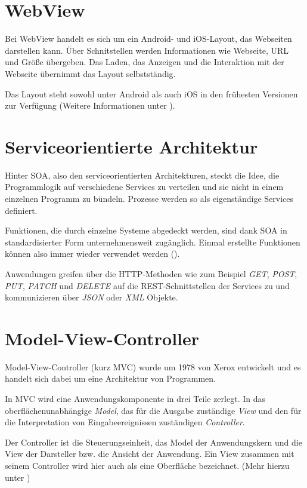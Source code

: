 \section{WebView}
Bei WebView handelt es sich um ein Android- und iOS-Layout, das Webseiten darstellen kann. Über Schnitstellen werden
Informationen wie Webseite, URL und Größe übergeben. Das Laden, das Anzeigen und die Interaktion mit der Webseite übernimmt
das Layout selbstständig.

Das Layout steht sowohl unter Android als auch iOS in den frühesten Versionen zur Verfügung (Weitere Informationen unter
\cite{online_grundlagen_webviewer}).

\section{Serviceorientierte Architektur}
Hinter SOA, also den serviceorientierten Architekturen, steckt die Idee, die Programmlogik auf verschiedene
Services zu verteilen und sie nicht in einem einzelnen Programm zu bündeln. Prozesse werden so als eigenständige Services
definiert.

Funktionen, die durch einzelne Systeme abgedeckt werden, sind dank SOA in standardisierter Form unternehmensweit
zugänglich. Einmal erstellte Funktionen können also immer wieder verwendet werden (\cite{book_grundlagen_soa}).

Anwendungen greifen über die HTTP-Methoden wie zum Beispiel \textit{GET}, \textit{POST}, \textit{PUT}, \textit{PATCH}
und \textit{DELETE} auf die REST-Schnittstellen der Services zu und kommunizieren über \textit{JSON} oder \textit{XML}
Objekte.

\section{Model-View-Controller}
Model-View-Controller (kurz MVC) wurde um 1978 von Xerox entwickelt und es handelt sich dabei um eine Architektur von
Programmen.

In MVC wird eine Anwendungskomponente in drei Teile zerlegt. In das oberflächenunabhängige \textit{Model}, das für die
Ausgabe zuständige \textit{View} und den für die Interpretation von Eingabeereignissen zuständigen \textit{Controller}.

Der Controller ist die Steuerungseinheit, das Model der Anwendungskern und die View der Darsteller bzw. die Ansicht der
Anwendung. Ein View zusammen mit seinem Controller wird hier auch als eine Oberfläche bezeichnet.
(Mehr hierzu unter \cite{book_prototypischeanwendung_mvc})


